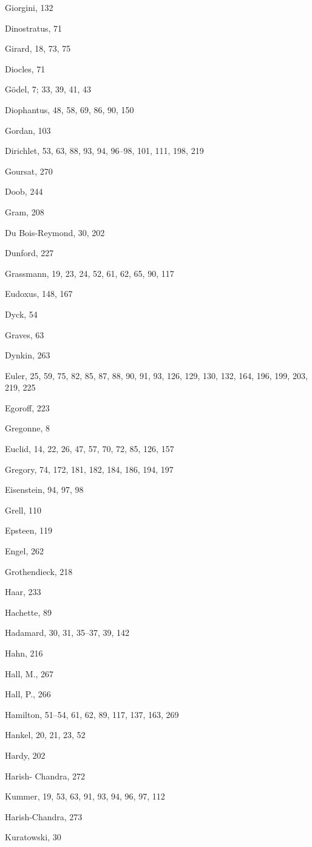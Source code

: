Giorgini, 132

Dinostratus, 71

Girard, 18, 73, 75

Diocles, 71

Gödel, 7; 33, 39, 41, 43

Diophantus, 48, 58, 69, 86, 90, 150

Gordan, 103

Dirichlet, 53, 63, 88, 93, 94, 96--98, 101, 111, 198, 219

Goursat, 270

Doob, 244

Gram, 208

Du Bois-Reymond, 30, 202

Dunford, 227

Grassmann, 19, 23, 24, 52, 61, 62, 65, 90, 117

Eudoxus, 148, 167

Dyck, 54

Graves, 63

Dynkin, 263

Euler, 25, 59, 75, 82, 85, 87, 88, 90, 91, 93, 126, 129, 130, 132, 164, 196, 199, 203, 219, 225

Egoroff, 223

Gregonne, 8

Euclid, 14, 22, 26, 47, 57, 70, 72, 85, 126, 157

Gregory, 74, 172, 181, 182, 184, 186, 194, 197

Eisenstein, 94, 97, 98

Grell, 110

Epsteen, 119

Engel, 262

Grothendieck, 218

Haar, 233

Hachette, 89

Hadamard, 30, 31, 35--37, 39, 142

Hahn, 216

Hall, M., 267

Hall, P., 266

Hamilton, 51--54, 61, 62, 89, 117, 137, 163, 269

Hankel, 20, 21, 23, 52

Hardy, 202

Harish- Chandra, 272

Kummer, 19, 53, 63, 91, 93, 94, 96, 97, 112

Harish-Chandra, 273

Kuratowski, 30

